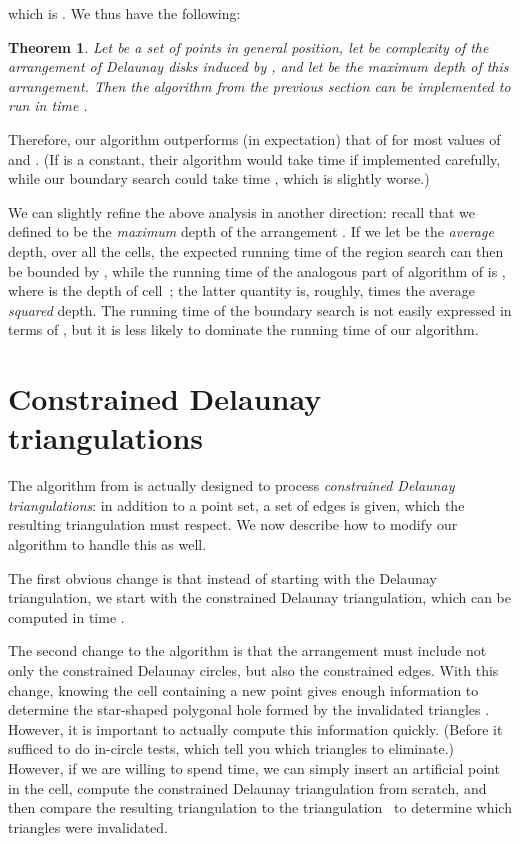 \documentclass{cccg13}
\newtheorem{theorem}{Theorem}
\begin{document}
which is .  We thus have the following:
\begin{theorem} Let  be a set of  points in general position, let  be complexity of the arrangement of Delaunay disks induced by , and let  be the maximum depth of this arrangement.  Then the algorithm from the previous section can be implemented to run in time .
\end{theorem}
Therefore, our algorithm outperforms (in expectation) that of \cite{orig} for most values of  and .  (If  is a constant, their algorithm would take  time if implemented carefully, while our boundary search could take time , which is slightly worse.)

We can slightly refine the above analysis in another direction: recall that we defined  to be the \emph{maximum} depth of the arrangement .  If we let  be the \emph{average} depth, over all the cells, the expected running time of the region search can then be bounded by
, while the running time of the analogous part of algorithm of \cite{orig} is , where  is the depth of cell~; the latter quantity is, roughly,  times the average \emph{squared} depth.  The running time of the boundary search is not easily expressed in terms of , but it is less likely to dominate the running time of our algorithm.

\section{Constrained Delaunay triangulations}\label{sec:cdt}
The algorithm from \cite{orig} is actually designed to process
\emph{constrained Delaunay triangulations}: in addition to a point
set, a set of edges is given, which the resulting triangulation must respect.
We now describe how to modify our algorithm to handle this as well.

The first obvious change is that instead of starting with the Delaunay triangulation, we start with the constrained Delaunay triangulation, which can be computed in  time \cite{cdt}.

The second change to the algorithm is that the arrangement  must include not only the constrained Delaunay circles, but also the constrained edges.  With this change, knowing the cell containing a new point gives enough information to determine the star-shaped polygonal hole formed by the invalidated triangles \cite{orig}.  However, it is important to actually compute this information quickly.  (Before it sufficed to do  in-circle tests, which tell you which triangles to eliminate.)  However, if we are willing to spend  time, we can simply insert an artificial point in the cell, compute the constrained Delaunay triangulation from scratch, and then compare the resulting triangulation to the triangulation~ to determine which triangles were invalidated.
\end{document}
